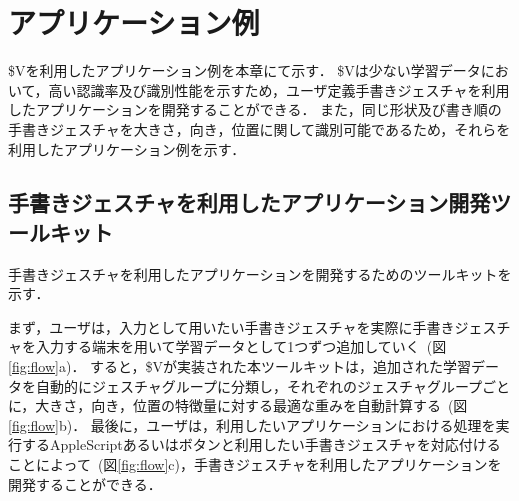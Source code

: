 \chapter{アプリケーション例}
\$Vを利用したアプリケーション例を本章にて示す．
\$Vは少ない学習データにおいて，高い認識率及び識別性能を示すため，ユーザ定義手書きジェスチャを利用したアプリケーションを開発することができる．
また，同じ形状及び書き順の手書きジェスチャを大きさ，向き，位置に関して識別可能であるため，それらを利用したアプリケーション例を示す．

\section{手書きジェスチャを利用したアプリケーション開発ツールキット}
手書きジェスチャを利用したアプリケーションを開発するためのツールキットを示す．

まず，ユーザは，入力として用いたい手書きジェスチャを実際に手書きジェスチャを入力する端末を用いて学習データとして1つずつ追加していく~(図\ref{fig:flow}a)．
すると，\$Vが実装された本ツールキットは，追加された学習データを自動的にジェスチャグループに分類し，それぞれのジェスチャグループごとに，大きさ，向き，位置の特徴量に対する最適な重みを自動計算する~(図\ref{fig:flow}b)．
最後に，ユーザは，利用したいアプリケーションにおける処理を実行するAppleScriptあるいはボタンと利用したい手書きジェスチャを対応付けることによって~(図\ref{fig:flow}c)，手書きジェスチャを利用したアプリケーションを開発することができる．


